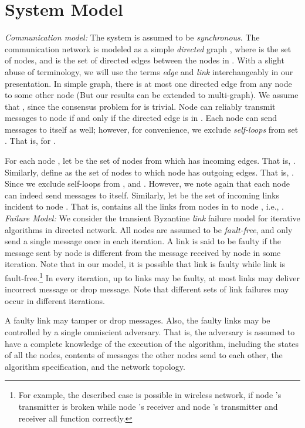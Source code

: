 \documentclass{llncs}
\begin{document}
\section{System Model}
\label{s_models}


{\em Communication model:}
The system is assumed to be {\em synchronous}. The communication network is modeled as a simple {\em directed} graph , where  is the set of  nodes, and  is the set of directed edges between the nodes in .
With a slight abuse of terminology, we will use the terms {\em edge}
and {\em link} interchangeably in our presentation.
In simple graph, there is at most one directed edge from any node  to some other node  (But our results can be extended to multi-graph).
We assume that , since the consensus problem for  is trivial.
Node  can reliably transmit messages to node  if and only if
the directed edge  is in .
Each node can send messages to itself as well; however,
for convenience, we exclude {\em self-loops} from set .
That is,  for .




For each node , let  be the set of nodes from which  has incoming edges.
That is, .
Similarly, define  as the set of nodes to which node 
has outgoing edges. That is, .
Since we exclude self-loops from ,
 and . 
However, we note again that each node can indeed send messages to itself. Similarly, let  be the set of incoming links incident to node . That is,  contains all the links from nodes in  to node , i.e., .\\


{\em Failure Model:}
We consider the transient Byzantine {\em link} failure model \cite{Santoro_link,Santoro_link2} for iterative algorithms in directed network. All nodes are assumed to be {\em fault-free}, and only send a single message once in each iteration. 
A link  is said to be faulty if the message sent by node  is different from the message received by node  in some iteration. Note that in our model, it is possible that link  is faulty while link  is fault-free.\footnote{For example, the described case is possible in wireless network, if node 's transmitter is broken while node 's receiver and node 's transmitter and receiver all function correctly.} In every iteration, up to  links may be faulty, at most  links may deliver incorrect message or drop message. Note that different sets of link failures may occur in different iterations.

A faulty link may tamper or drop messages. Also, the faulty links may be controlled by a single omniscient adversary. That is, the adversary is assumed to have a complete knowledge of the execution of
the algorithm, including the states of all the nodes,
contents of messages the other nodes send to each other,
the algorithm specification, and the network topology. 
\end{document}
